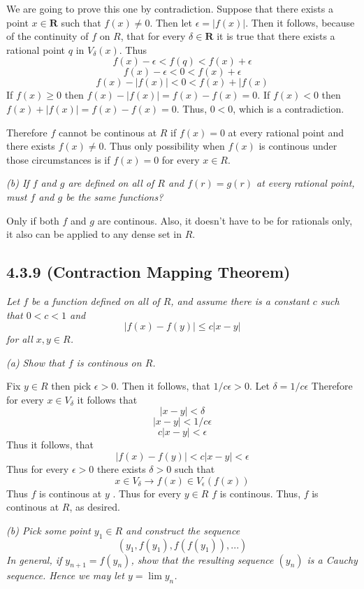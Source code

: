 \documentclass[11pt,oneside,titlepage]{book}
\begin{document}
We are going to prove this one by contradiction. Suppose that there exists a
point $x \in \textbf{R}$ such that $f(x) \neq 0$. Then let
$\epsilon = |f(x)|$. Then it follows, because of the continuity of $f$ on $R$,
that for every $\delta \in \textbf{R}$
it is true that there exists a rational point $q$ in $V_\delta(x)$.
Thus
$$f(x) - \epsilon < f(q) < f(x) + \epsilon$$
$$f(x) - \epsilon < 0 < f(x) + \epsilon$$
$$f(x) - |f(x)| < 0 < f(x) + |f(x)$$
If $f(x) \geq 0$ then $f(x) - |f(x)| = f(x) - f(x) = 0$.
If $f(x) < 0$ then $f(x) + |f(x)| = f(x) - f(x) = 0$.
Thus, $0 < 0$, which is a contradiction.

Therefore $f$ cannot be continous at $R$ if $f(x) = 0$ at every rational point
and there exists $f(x) \neq 0$. Thus only possibility when $f(x)$ is
continous under those circumstances is if $f(x) = 0$ for every $x \in R$.

\textit{(b) If $f$ and $g$ are defined on all of $R$ and $f(r) = g(r)$ at
  every rational  point, must $f$ and $g$ be the same functions? }

Only if both  $f$ and $g$ are continous. Also, it doesn't have to be for
rationals only, it also can be applied to any dense set in $R$.

\subsection*{4.3.9 (Contraction Mapping Theorem)}
\textit{Let $f$ be a function defined on all of $R$, and assume there is a
  constant $c$ such that $0 < c < 1$ and}
$$|f(x) - f(y)| \leq c|x - y|$$
\textit{for all $x,y \in R$.}

\textit{(a) Show that $f$ is continous on $R$.}

Fix $y \in R$ then pick $\epsilon > 0$.
Then it follows, that $1/c \epsilon > 0$. Let $\delta = 1/c \epsilon$
Therefore for every  $x \in V_\delta$ it follows that
$$|x - y| < \delta$$
$$|x - y| < 1/c \epsilon$$
$$c |x - y| <  \epsilon$$
Thus it follows, that
$$|f(x) - f(y)| < c |x - y| <  \epsilon$$
Thus for every $\epsilon > 0$ there exists $\delta > 0$ such that
$$x \in V_\delta \to f(x) \in V_\epsilon(f(x))$$
Thus $f$ is continous at $y$ . Thus for every $y \in R$ $f$ is continous.
Thus, $f$ is continous at $R$, as desired.

\textit{(b) Pick some point $y_1 \in R$ and construct the sequence }
$$(y_1, f(y_1), f(f(y_1)), ... )$$
\textit{In general, if $y_{n + 1} = f(y_n)$, show that
  the resulting sequence $(y_n)$
  is a Cauchy sequence. Hence we may let $y = \lim y_n$.}
\end{document}
